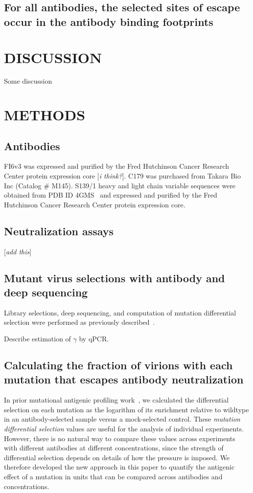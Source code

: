 \documentclass[11pt]{article}
\newcommand{\comment}[1]{{\color{red}[\textsl{#1}]}}
\begin{document}
\subsection*{For all antibodies, the selected sites of escape occur in the antibody binding footprints}

\section*{DISCUSSION}
Some discussion

\clearpage

\section*{METHODS}
\label{sec:methods}
\subsection*{Antibodies}
FI6v3 was expressed and purified by the Fred Hutchinson Cancer Research Center protein expression core \comment{i think?}.
C179 was purchased from Takara Bio Inc (Catalog \# M145).
S139/1 heavy and light chain variable sequences were obtained from PDB ID 4GMS~\cite{lee2012heterosubtypic} and expressed and purified by the Fred Hutchinson Cancer Research Center protein expression core.

\subsection*{Neutralization assays}
\comment{add this}

\subsection*{Mutant virus selections with antibody and deep sequencing}
Library selections, deep sequencing, and computation of mutation differential selection were performed as previously described~\cite{doud2017complete}. 

Describe estimation of $\gamma$ by qPCR.

\subsection*{Calculating the fraction of virions with each mutation that escapes antibody neutralization}
In prior mutational antigenic profiling work~\citep{doud2017complete,dingens2017comprehensive}, we calculated the differential selection on each mutation as the logarithm of its enrichment relative to wildtype in an antibody-selected sample versus a mock-selected control.
These \emph{mutation differential selection} values are useful for the analysis of individual experiments.
However, there is no natural way to compare these values across experiments with different antibodies at different concentrations, since the strength of differential selection depends on details of how the pressure is imposed.
We therefore developed the new approach in this paper to quantify the antigenic effect of a mutation in units that can be compared across antibodies and concentrations.
\end{document}
